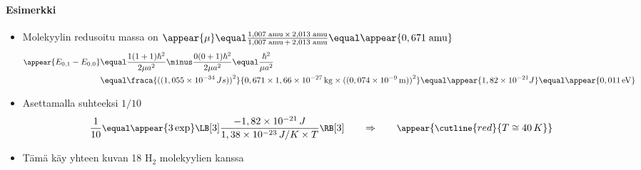 \begin{frame}
\frametitle{\texorpdfstring{\culine[\sectiontitleulinecolor]{\sectiontitle}}{\sectiontitle} }
\framesubtitle{Esimerkki}
\appear{}

\begin{itemize}[itemsep=1.7mm]
	\item Molekyylin redusoitu massa on 
	$
\appear{\mu}  \equal \frac{1,007 \mathrm{\;amu} \,\times\, 2,013 \mathrm{\;amu}}{1,007 \mathrm{\;amu} \,+\,2,013 \mathrm{\;amu}}  \equal \appear{0,671 \mathrm{\;amu}}
$
	$$
	 \begin{aligned}  \small
	 \appear{E_{0,1}-E_{0,0}} & \equal \frac{1(1+1) \hbar^{2}}{2 \mu a^{2}}  \minus \frac{0(0+1) \hbar^{2}}{2 \mu a^{2}}  \equal \frac{\hbar^{2}}{\mu a^{2}} \\
	 & \equal \fraca{ \textrm{((}1,055 \times 10^{-34} \,Js \textrm{))}^{2}}{0,671 \times 1,66 \times 10^{-27} \mathrm{\,kg} \times \textrm{((}0,074 \times 10^{-9} \mathrm{\,m} \textrm{))}^{2}}  \equal \appear{1,82 \times 10^{-21} J}  \equal \appear{0,011 \mathrm{\,eV}}
	 \end{aligned} 
	 $$ 
	
\item Asettamalla suhteeksi $1 / 10$ 
\[ \small
\frac{1}{10}  \equal \appear{3 \exp}  \LB[3] \frac{-1,82 \times 10^{-21} \,J}{1,38 \times 10^{-23} \,J / K \times T} \RB[3] \qquad \Rightarrow \qquad \appear{ \cutline{red}{T \cong 40 \,K}}
\]
\vspace{-2mm} 

\item Tämä käy yhteen kuvan 18 $\mathrm{H}_{2}$ molekyylien kanssa
\end{itemize}

\endofslide 
\end{frame}

